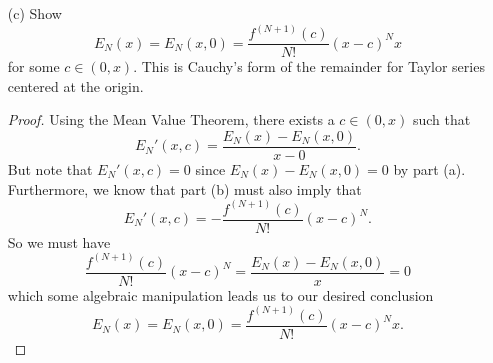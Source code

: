 \begin{enumerate}
\begin{proof}[Solution]
        \end{proof}
    \item[(c)] Show
        \[  E_{N}(x) = E_{N}(x,0) = \frac{ f^{(N+1)}(c) }{ N! } (x-c)^{N} x \] for some \( c  \in (0,x) \). This is Cauchy's form of the remainder for Taylor series centered at the origin.
        \begin{proof}
        Using the Mean Value Theorem, there exists a \( c \in (0,x)  \) such that 
        \[  E_{N}'(x,c) = \frac{ E_{N}(x) - E_{N}(x,0)  }{ x - 0  }.  \]
        But note that \(  E_{N}'(x,c) = 0 \) since \( E_N(x) - E_N(x,0) = 0  \) by part (a). Furthermore, we know that part (b) must also imply that 
        \[  E_{N}'(x,c) = - \frac{ f^{(N+1)}(c)  }{ N! } (x-c)^{N}. \]
        So we must have 
        \[  \frac{ f^{(N+1)}(c)  }{ N! } (x-c)^{N} = \frac{ E_{N}(x) - E_{N}(x,0) }{ x  } = 0  \]
        which some algebraic manipulation leads us to our desired conclusion
        \[  E_{N}(x) = E_{N}(x,0) = \frac{ f^{(N+1)}(c)  }{ N! } (x-c)^{N} x. \]
        \end{proof}
\end{enumerate}







